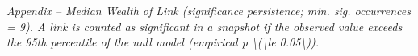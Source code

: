 \begin{table}[!ht]
\centering
\small
{}
\vspace{2mm}\textit{Appendix – Median Wealth of Link (significance persistence; min. sig. occurrences = 9). A link is counted as significant in a snapshot if the observed value exceeds the 95th percentile of the null model (empirical p \textbackslash{}(\textbackslash{}le 0.05\textbackslash{})).}
\end{table}